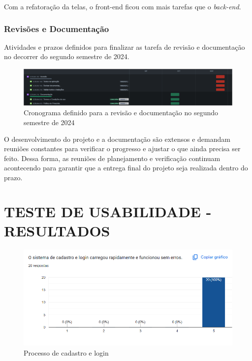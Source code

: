 \begin{apendicesenv}
Com a refatoração da telas, o front-end ficou com mais tarefas que o \textit{back-end}.

\subsection*{Revisões e Documentação}
Atividades e prazos definidos para finalizar as tarefa de revisão e documentação no decorrer do segundo semestre de 2024.

\begin{figure}[ht]
        \centering
\includegraphics[width=1.0\textwidth]{images/revisao-cronograma.png}
        \caption{Cronograma definido para a revisão e documentação no segundo semestre de 2024}
        \label{fig:revisaocronograma}
    \end{figure}

O desenvolvimento do projeto e a documentação são extensos e demandam reuniões constantes para verificar o progresso e ajustar o que ainda precisa ser feito. Dessa forma, as reuniões de planejamento e verificação continuam acontecendo para garantir que a entrega final do projeto seja realizada dentro do prazo.

\chapter{TESTE DE USABILIDADE - RESULTADOS}
\label{apendice_l}

\begin{figure}[H]
    \centering
    \includegraphics[width=1.0\linewidth]{images/cadastro.png}
    \caption{Processo de cadastro e login}
    \label{fig:cadastro}
\end{figure}


\end{apendicesenv}
